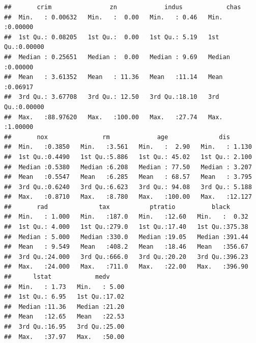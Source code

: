 \documentclass[
]{article}
\begin{document}
\begin{verbatim}
##       crim                zn             indus            chas        
##  Min.   : 0.00632   Min.   :  0.00   Min.   : 0.46   Min.   :0.00000  
##  1st Qu.: 0.08205   1st Qu.:  0.00   1st Qu.: 5.19   1st Qu.:0.00000  
##  Median : 0.25651   Median :  0.00   Median : 9.69   Median :0.00000  
##  Mean   : 3.61352   Mean   : 11.36   Mean   :11.14   Mean   :0.06917  
##  3rd Qu.: 3.67708   3rd Qu.: 12.50   3rd Qu.:18.10   3rd Qu.:0.00000  
##  Max.   :88.97620   Max.   :100.00   Max.   :27.74   Max.   :1.00000  
##       nox               rm             age              dis        
##  Min.   :0.3850   Min.   :3.561   Min.   :  2.90   Min.   : 1.130  
##  1st Qu.:0.4490   1st Qu.:5.886   1st Qu.: 45.02   1st Qu.: 2.100  
##  Median :0.5380   Median :6.208   Median : 77.50   Median : 3.207  
##  Mean   :0.5547   Mean   :6.285   Mean   : 68.57   Mean   : 3.795  
##  3rd Qu.:0.6240   3rd Qu.:6.623   3rd Qu.: 94.08   3rd Qu.: 5.188  
##  Max.   :0.8710   Max.   :8.780   Max.   :100.00   Max.   :12.127  
##       rad              tax           ptratio          black       
##  Min.   : 1.000   Min.   :187.0   Min.   :12.60   Min.   :  0.32  
##  1st Qu.: 4.000   1st Qu.:279.0   1st Qu.:17.40   1st Qu.:375.38  
##  Median : 5.000   Median :330.0   Median :19.05   Median :391.44  
##  Mean   : 9.549   Mean   :408.2   Mean   :18.46   Mean   :356.67  
##  3rd Qu.:24.000   3rd Qu.:666.0   3rd Qu.:20.20   3rd Qu.:396.23  
##  Max.   :24.000   Max.   :711.0   Max.   :22.00   Max.   :396.90  
##      lstat            medv      
##  Min.   : 1.73   Min.   : 5.00  
##  1st Qu.: 6.95   1st Qu.:17.02  
##  Median :11.36   Median :21.20  
##  Mean   :12.65   Mean   :22.53  
##  3rd Qu.:16.95   3rd Qu.:25.00  
##  Max.   :37.97   Max.   :50.00
\end{verbatim}
\end{document}
